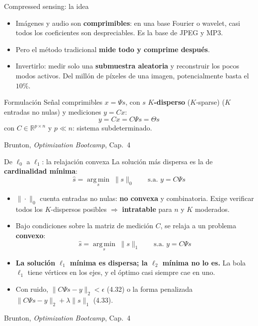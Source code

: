 \documentclass[10pt,aspectratio=169]{beamer}
\newcommand{\fuente}{\vfill{\scriptsize\color{gray}Brunton, \emph{Optimization Bootcamp}, Cap.~4}}
\newcommand{\R}{\mathbb{R}}
\newcommand{\argmin}{\operatorname*{arg\,min}}
\begin{document}
\begin{frame}{Compressed sensing: la idea}
  \small
  \begin{itemize}
    \item Imágenes y audio son \textbf{comprimibles}: en una base Fourier o
      wavelet, casi todos los coeficientes son despreciables. Es la base de
      JPEG y MP3.
    \item Pero el  método tradicional \textbf{mide todo y comprime después}.
    \item Invertirlo: medir solo una \textbf{submuestra aleatoria} y reconstruir
      los pocos modos activos. Del millón de píxeles de una imagen,
      potencialmente basta el $10\%$.
  \end{itemize}

  \vspace{1mm}
  \begin{block}{Formulación}
    Señal comprimibles $x = \Psi s$, con $s$ \textbf{$K$-disperso} ($K$-sparse)
    ($K$ entradas no nulas) y mediciones $y = Cx$:
    \[
      y = Cx = C\Psi s = \Theta s \tag{4.29}
    \]
    con $C \in \R^{p\times n}$ y $p \ll n$: sistema subdeterminado.
  \end{block}
  \fuente
\end{frame}

\begin{frame}{De $\ell_0$ a $\ell_1$: la relajación convexa}
  \small
  La solución más dispersa es la de \textbf{cardinalidad mínima}:
  \[
    \hat{s} = \argmin_s \; \|s\|_0
    \qquad \text{s.a. } y = C\Psi s \tag{4.30}
  \]
  \begin{itemize}
    \item $\|\cdot\|_0$ cuenta entradas no nulas: \textbf{no convexa} y
      combinatoria. Exige verificar todos los $K$-dispersos posibles
      $\Rightarrow$ \textbf{intratable} para $n$ y $K$ moderados.
    \item Bajo condiciones sobre la matriz de medición $C$, se relaja a un
      problema \textbf{convexo}:
      \[
        \hat{s} = \argmin_s \; \|s\|_1
        \qquad \text{s.a. } y = C\Psi s \tag{4.31}
      \]
  \item \textbf{La solución $\ell_1$ mínima es dispersa; la
      $\ell_2$ mínima no lo es.} La bola $\ell_1$ tiene vértices en los ejes,
      y el óptimo casi siempre cae en uno.
    \item Con ruido, $\|C\Psi s - y\|_2 < \epsilon$ (4.32) o la forma
      penalizada $\|C\Psi s-y\|_2 + \lambda\|s\|_1$ (4.33).
  \end{itemize}
  \fuente
\end{frame}
\end{document}

